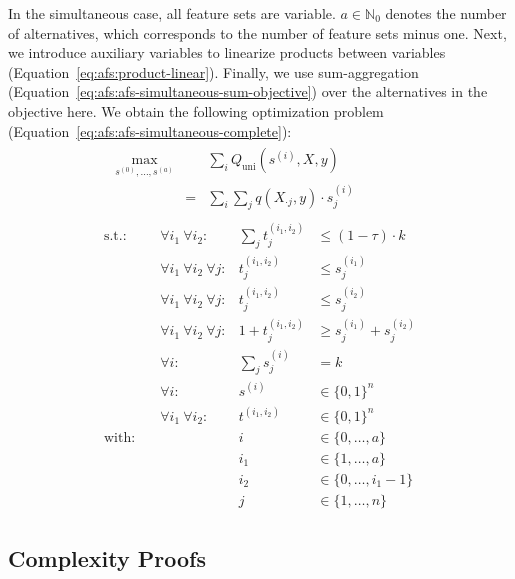 \documentclass[iicol, sn-basic, Numbered]{sn-jnl} %
\theoremstyle{plain}
\theoremstyle{definition}
\begin{document}
\begin{appendices}
In the simultaneous case, all feature sets are variable.
$a \in \mathbb{N}_0$ denotes the number of alternatives, which corresponds to the number of feature sets minus one.
Next, we introduce auxiliary variables to linearize products between variables (Equation~\ref{eq:afs:product-linear}).
Finally, we use sum-aggregation (Equation~\ref{eq:afs:afs-simultaneous-sum-objective}) over the alternatives in the objective here.
We obtain the following optimization problem (Equation~\ref{eq:afs:afs-simultaneous-complete}):
%
\begin{equation}
	\begin{gathered}
		\begin{aligned}
			& \max_{s^{(0)}, \dots, s^{(a)}} & & \sum_i Q_{\text{uni}}(s^{(i)},X,y) \\
			& & = & \sum_i \sum_j q(X_{\cdot{}j},y) \cdot s^{(i)}_j
		\end{aligned} \\
		\begin{aligned}
			\text{s.t.:} &\quad \forall i_1~\forall i_2: & \sum_j t^{(i_1,i_2)}_j &\leq (1 - \tau) \cdot k \\
			&\quad \forall i_1~\forall i_2~\forall j: & t^{(i_1,i_2)}_j &\leq s^{(i_1)}_j \\
			&\quad \forall i_1~\forall i_2~\forall j: & t^{(i_1,i_2)}_j &\leq s^{(i_2)}_j \\
			&\quad \forall i_1~\forall i_2~\forall j: & 1 + t^{(i_1,i_2)}_j &\geq s^{(i_1)}_j + s^{(i_2)}_j \\
			&\quad \forall i: & \sum_j s^{(i)}_j &= k \\
			&\quad \forall i: & s^{(i)} &\in \{0,1\}^n \\
			&\quad \forall i_1~\forall i_2: & t^{(i_1,i_2)} &\in \{0,1\}^n \\
			\text{with:} & & i &\in \{0, \dots, a\} \\
			&\quad & i_1 &\in \{1, \dots, a\} \\
			&\quad & i_2 &\in \{0, \dots, i_1-1\} \\
			&\quad & j &\in \{1, \dots, n\}
		\end{aligned}
	\end{gathered}
	\label{eq:afs:afs-simultaneous-complete}
\end{equation}

\subsection{Complexity Proofs}
\label{sec:afs:appendix:complexity-proofs}


\end{appendices}
\end{document}

